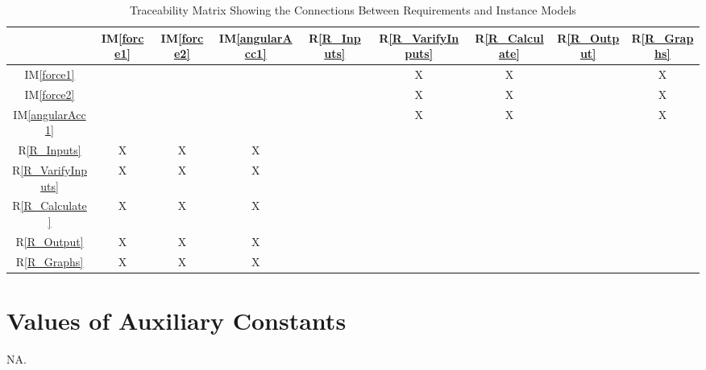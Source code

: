 \documentclass[12pt]{article}
\newcommand{\iref}[1]{IM\ref{#1}}
\newcommand{\rref}[1]{R\ref{#1}}
\begin{document}
\begin{table}[H]
\centering
\begin{tabular}{|c|c|c|c|c|c|c|c|c|}
\hline
  & \iref{force1}& \iref{force2}& \iref{angularAcc1}& \rref{R_Inputs}& \rref{R_VarifyInputs} &  \rref{R_Calculate} & \rref{R_Output} & \rref{R_Graphs}\\
\hline
\iref{force1}            &&&&&X&X&&X\\ \hline
\iref{force2}            &&&&&X&X&&X\\ \hline
\iref{angularAcc1}         &&&&&X&X&&X\\ \hline
\rref{R_Inputs}         &X&X&X&&&&&\\ \hline
\rref{R_VarifyInputs}         &X&X&X&&&&&\\ \hline
\rref{R_Calculate}     &X&X&X&&&&&\\ \hline
\rref{R_Output}    &X&X&X&&&&&\\  
\rref{R_Graphs}    &X&X&X&&&&&\\
\hline
\end{tabular}
\caption{Traceability Matrix Showing the Connections Between Requirements and Instance Models}
\label{Table:R_trace}
\end{table}




\section{Values of Auxiliary Constants}\label{sec_auxConst}

NA.
\end{document}
